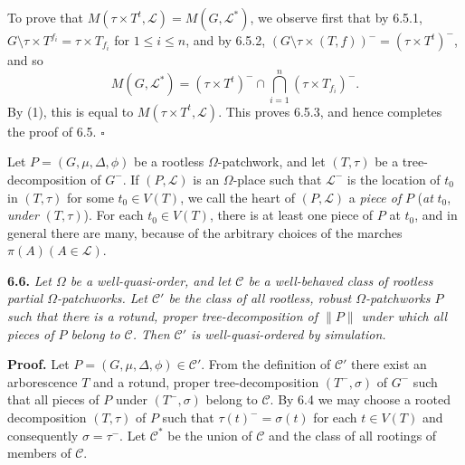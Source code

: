 To prove that $M(\tau \times T^t, \mathscr{L}) = M(G, \mathscr{L}^*)$, we observe first that by 6.5.1, $G \setminus \tau \times T^{f_i} = \tau \times T_{f_i}$ for $1 \le i \le n$, and by 6.5.2, $(G \setminus \tau \times (T, f))^- = (\tau \times T^t)^-$, and so
\begin{equation*}
M(G, \mathscr{L}^*) = (\tau \times T^t)^- \cap \bigcap_{i=1}^n (\tau \times T_{f_i})^-.
\end{equation*}
By (1), this is equal to $M(\tau \times T^t, \mathscr{L})$. This proves 6.5.3, and hence completes the proof of 6.5. $\square$

Let $P = (G, \mu, \Delta, \phi)$ be a rootless $\Omega$-patchwork, and let $(T, \tau)$ be a tree-decomposition of $G^-$. If $(P, \mathscr{L})$ is an $\Omega$-place such that $\mathscr{L}^-$ is the location of $t_0$ in $(T, \tau)$ for some $t_0 \in V(T)$, we call the heart of $(P, \mathscr{L})$ a \textit{piece of} $P$ (\textit{at} $t_0$, \textit{under} $(T, \tau)$). For each $t_0 \in V(T)$, there is at least one piece of $P$ at $t_0$, and in general there are many, because of the arbitrary choices of the marches $\pi(A) (A \in \mathscr{L})$.

\textbf{6.6.} \textit{Let $\Omega$ be a well-quasi-order, and let $\mathscr{C}$ be a well-behaved class of rootless partial $\Omega$-patchworks. Let $\mathscr{C}'$ be the class of all rootless, robust $\Omega$-patchworks $P$ such that there is a rotund, proper tree-decomposition of $\|P\|$ under which all pieces of $P$ belong to $\mathscr{C}$. Then $\mathscr{C}'$ is well-quasi-ordered by simulation.}

\textbf{Proof.} Let $P = (G, \mu, \Delta, \phi) \in \mathscr{C}'$. From the definition of $\mathscr{C}'$ there exist an arborescence $T$ and a rotund, proper tree-decomposition $(T^-, \sigma)$ of $G^-$ such that all pieces of $P$ under $(T^-, \sigma)$ belong to $\mathscr{C}$. By 6.4 we may choose a rooted decomposition $(T, \tau)$ of $P$ such that $\tau(t)^- = \sigma(t)$ for each $t \in V(T)$ and consequently $\sigma = \tau^-$. Let $\mathscr{C}^*$ be the union of $\mathscr{C}$ and the class of all rootings of members of $\mathscr{C}$.
